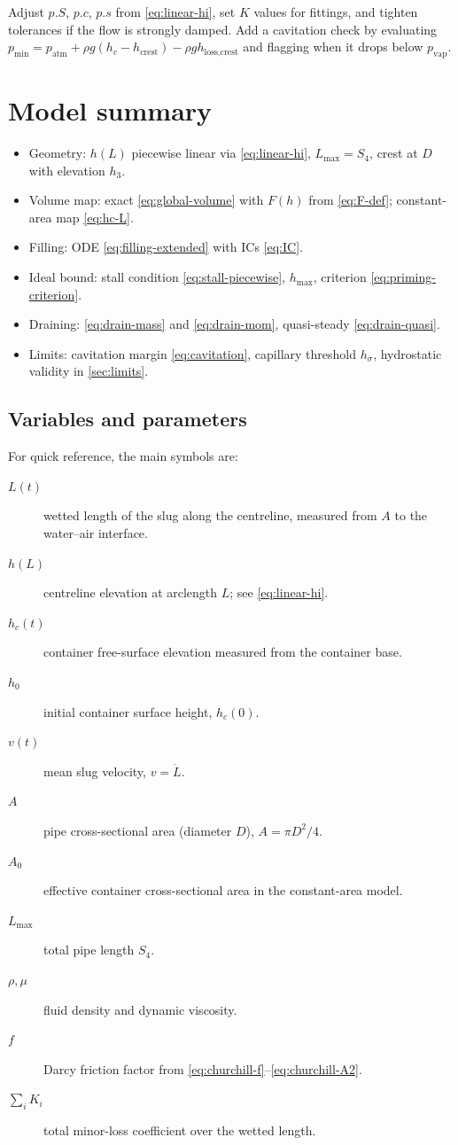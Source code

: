 \documentclass[11pt]{article}
\begin{document}
Adjust $p.S$, $p.c$, $p.s$ from \eqref{eq:linear-hi}, set $K$ values for fittings, and tighten tolerances if the flow is strongly damped. Add a cavitation check by evaluating $p_{\min}=p_{\mathrm{atm}}+\rho g(h_c-h_{\text{crest}})-\rho g h_{\text{loss,crest}}$ and flagging when it drops below $p_{\mathrm{vap}}$.

\section{Model summary}
\begin{itemize}
  \item Geometry: $h(L)$ piecewise linear via \eqref{eq:linear-hi}, $L_{\max}=S_4$, crest at $D$ with elevation $h_3$.
  \item Volume map: exact \eqref{eq:global-volume} with $F(h)$ from \eqref{eq:F-def}; constant-area map \eqref{eq:hc-L}.
  \item Filling: ODE \eqref{eq:filling-extended} with ICs \eqref{eq:IC}.
  \item Ideal bound: stall condition \eqref{eq:stall-piecewise}, $h_{\max}$, criterion \eqref{eq:priming-criterion}.
  \item Draining: \eqref{eq:drain-mass} and \eqref{eq:drain-mom}, quasi-steady \eqref{eq:drain-quasi}.
  \item Limits: cavitation margin \eqref{eq:cavitation}, capillary threshold $h_{\sigma}$, hydrostatic validity in \cref{sec:limits}.
\end{itemize}
\subsection*{Variables and parameters}
For quick reference, the main symbols are:
\begin{description}
  \item[$L(t)$] wetted length of the slug along the centreline, measured from $A$ to the water--air interface.
  \item[$h(L)$] centreline elevation at arclength $L$; see \eqref{eq:linear-hi}.
  \item[$h_c(t)$] container free-surface elevation measured from the container base.
  \item[$h_0$] initial container surface height, $h_c(0)$.
  \item[$v(t)$] mean slug velocity, $v=\dot L$.
  \item[$A$] pipe cross-sectional area (diameter $D$), $A=\pi D^2/4$.
  \item[$A_0$] effective container cross-sectional area in the constant-area model.
  \item[$L_{\max}$] total pipe length $S_4$.
  \item[$\rho,\mu$] fluid density and dynamic viscosity.
  \item[$f$] Darcy friction factor from \eqref{eq:churchill-f}--\eqref{eq:churchill-A2}.
  \item[$\sum_i K_i$] total minor-loss coefficient over the wetted length.
\end{description}
\end{document}
